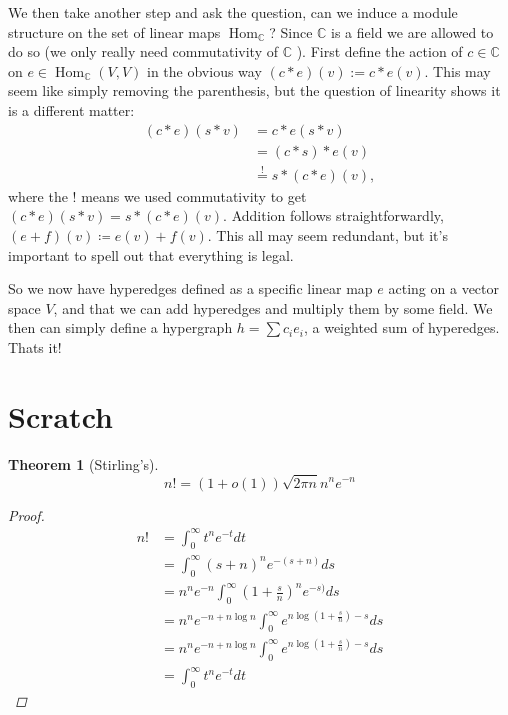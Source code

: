 \documentclass{article}
\newcommand{\parens}[1]{\left( #1 \right)}
\newcommand{\field}{\mathbb{C}}
\DeclareMathOperator{\Hom}{Hom}
\newtheorem{theorem}{Theorem}
\begin{document}
We then take another step and ask the question, can we induce a module structure on the set of linear maps $\Hom_{\field}$? Since $\field$ is a field we are allowed to do so (we only really need commutativity of $\field$ ). First define the action of $c \in \field$ on $e \in \Hom_\field(V, V)$ in the obvious way $(c * e) (v) := c * e(v)$. This may seem like simply removing the parenthesis, but the question of linearity shows it is a different matter:
\begin{align}
    (c * e) (s * v) &= c * e( s * v) \\
    &= (c * s) * e(v) \\
    &\overset{!}{=} s * (c * e) (v),
\end{align}
where the ! means we used commutativity to get $(c *e) (s * v) = s * (c * e) (v)$. Addition follows straightforwardly, $(e+f) (v) \coloneqq e(v) + f(v)$. This all may seem redundant, but it's important to spell out that everything is legal.

So we now have hyperedges defined as a specific linear map $e$ acting on a vector space $V$, and that we can add hyperedges and multiply them by some field. We then can simply define a hypergraph $h = \sum c_i e_i$, a weighted sum of hyperedges. Thats it! 


\section{Scratch}

\begin{theorem}[Stirling's]
    \begin{equation}
        n! = (1 + o(1)) \sqrt{2 \pi n} n^n e^{-n}
    \end{equation}
    \begin{proof}
    \begin{align}
        n! &= \int_0^\infty t^n e^{-t} dt \\
        &= \int_0^\infty (s+n)^{n} e^{-(s+n)} ds \\
        &= n^n e^{-n} \int_0^\infty \parens{ 1 + \frac{s}{n}}^{n} e^{-s)} ds \\
        &= n^n e^{-n + n \log n} \int_0^\infty e^{n \log \parens{1 + \frac{s}{n}} - s} ds \\
        &= n^n e^{-n + n \log n} \int_0^\infty e^{n \log \parens{1 + \frac{s}{n}} - s} ds \\
        &= \int_0^\infty t^n e^{-t} dt 
    \end{align}
\end{proof}
\end{theorem}
\end{document}
